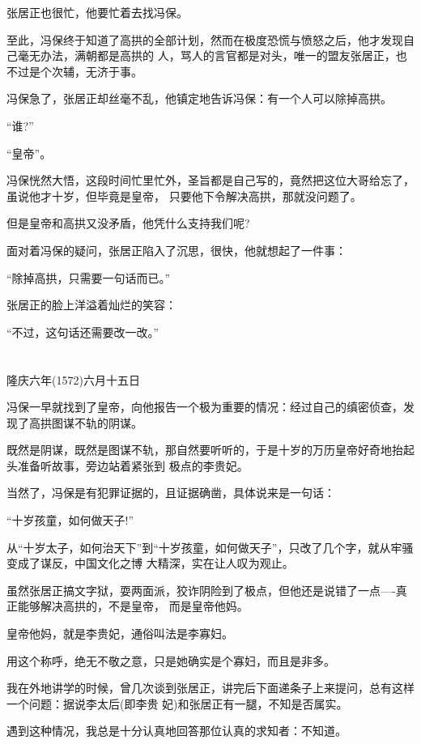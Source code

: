 \documentclass[11pt,a4paper,onecolumn]{article}
\begin{document}
张居正也很忙，他要忙着去找冯保。

至此，冯保终于知道了高拱的全部计划，然而在极度恐慌与愤怒之后，他才发现自己毫无办法，满朝都是高拱的
人，骂人的言官都是对头，唯一的盟友张居正，也不过是个次辅，无济于事。

冯保急了，张居正却丝毫不乱，他镇定地告诉冯保：有一个人可以除掉高拱。

``谁?''

``皇帝''。

冯保恍然大悟，这段时间忙里忙外，圣旨都是自己写的，竟然把这位大哥给忘了，虽说他才十岁，但毕竟是皇帝，
只要他下令解决高拱，那就没问题了。

但是皇帝和高拱又没矛盾，他凭什么支持我们呢?

面对着冯保的疑问，张居正陷入了沉思，很快，他就想起了一件事：

``除掉高拱，只需要一句话而已。''

张居正的脸上洋溢着灿烂的笑容：

``不过，这句话还需要改一改。''

\section[\thesection]{}

隆庆六年(1572)六月十五日　　

冯保一早就找到了皇帝，向他报告一个极为重要的情况：经过自己的缜密侦查，发现了高拱图谋不轨的阴谋。

既然是阴谋，既然是图谋不轨，那自然要听听的，于是十岁的万历皇帝好奇地抬起头准备听故事，旁边站着紧张到
极点的李贵妃。

当然了，冯保是有犯罪证据的，且证据确凿，具体说来是一句话：

``十岁孩童，如何做天子!''

从``十岁太子，如何治天下''到``十岁孩童，如何做天子''，只改了几个字，就从牢骚变成了谋反，中国文化之博
大精深，实在让人叹为观止。

虽然张居正搞文字狱，耍两面派，狡诈阴险到了极点，但他还是说错了一点----真正能够解决高拱的，不是皇帝，
而是皇帝他妈。

皇帝他妈，就是李贵妃，通俗叫法是李寡妇。

用这个称呼，绝无不敬之意，只是她确实是个寡妇，而且是非多。

我在外地讲学的时候，曾几次谈到张居正，讲完后下面递条子上来提问，总有这样一个问题：据说李太后(即李贵
妃)和张居正有一腿，不知是否属实。

遇到这种情况，我总是十分认真地回答那位认真的求知者：不知道。
\end{document}
